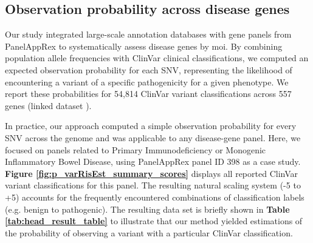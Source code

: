 \subsection{Observation probability across disease genes}

Our study integrated large-scale annotation databases with gene panels from PanelAppRex to systematically assess disease genes by \ac{moi}. By combining population allele frequencies with ClinVar clinical classifications, we computed an expected observation probability for each SNV, representing the likelihood of encountering a variant of a specific pathogenicity for a given phenotype. We report these probabilities for 54,814 ClinVar variant classifications across 557 genes (linked dataset \cite{lawless_2025_15111584}).

In practice, our approach computed a simple observation probability for every SNV across the genome and was applicable to any disease-gene panel. Here, we focused on panels related to Primary Immunodeficiency or Monogenic Inflammatory Bowel Disease, using PanelAppRex panel ID 398 as a case study.
\textbf{Figure \ref{fig:p_varRisEst_summary_scores}} displays all reported ClinVar  variant classifications for this panel. The resulting natural scaling system (-5 to +5) accounts for the frequently encountered combinations of classification labels (e.g. benign to pathogenic).
The resulting data set \cite{lawless_2025_15111584} is briefly shown in \textbf{Table \ref{tab:head_result_table}} to illustrate that our method yielded estimations of the probability of observing a variant with a particular ClinVar classification. 


